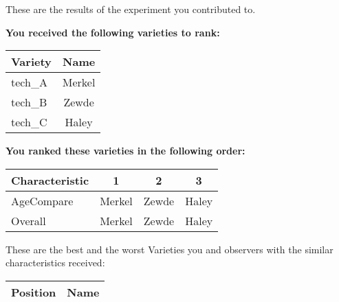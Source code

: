 \documentclass[10pt]{article}
\begin{document}
\begin{titlepage}
	These are the results of the experiment you contributed to.

	\begin{flushleft}
		\textbf{You received the following varieties to rank: }\hfill \break
		\begin{tabularx}{\textwidth}{ X | c  }
			\hline
			\textbf{Variety} & \textbf{Name} \\ \hline

			
				tech\_A & Merkel \\ \hline
			
				tech\_B & Zewde \\ \hline
			
				tech\_C & Haley \\ \hline
			


		\end{tabularx}\newline \newline

		\textbf{You ranked these varieties in the following order: }\hfill \break
		\begin{tabularx}{\textwidth}{ X | c | c | c  }
			\hline
			\textbf{Characteristic}
			
				& \textbf{ 1 }
			
				& \textbf{ 2 }
			
				& \textbf{ 3 }
			
			\\ \hline


			
				AgeCompare & Merkel  & Zewde  & Haley  \\ \hline


			
				Overall & Merkel  & Zewde  & Haley  \\ \hline


			

		\end{tabularx}

	\end{flushleft}

	\pagebreak

	\begin{flushleft}
		These are the best and the worst Varieties you and observers with the similar characteristics received:\hfill \break \newline
		\begin{tabularx}{\textwidth}{ X | X  }
			\hline
			\textbf{Position} & \textbf{Name} \\ \hline


\end{tabularx}
\end{flushleft}
\end{titlepage}
\end{document}
